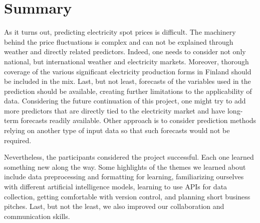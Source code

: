 \documentclass{article}
\numberwithin{equation}{section}
\begin{document}
\section{Summary}
As it turns out, predicting electricity spot prices is difficult. The machinery behind the price fluctuations is complex and can not be explained through weather and directly related predictors. Indeed, one needs to consider not only national, but international weather and electricity markets. Moreover, thorough coverage of the various significant electricity production forms in Finland should be included in the mix. Last, but not least, forecasts of the variables used in the prediction should be available, creating further limitations to the applicability of data. Considering the future continuation of this project, one might try to add more predictors that are directly tied to the electricity market and have long-term forecasts readily available. Other approach is to consider prediction methods relying on another type of input data so that such forecasts would not be required.

Nevertheless, the participants considered the project successful. Each one learned something new along the way. Some highlights of the themes we learned about include data preprocessing and formatting for learning, familiarizing ourselves with different artificial intelligence models, learning to use APIs for data collection, getting comfortable with version control, and planning short business pitches. Last, but not the least, we also improved our collaboration and communication skills.



\iffalse
\begin{figure}[htb]
\centering
\texttt{[image: ./largestEigenvalue.eps]}
\caption{Suurimman ominaisarvon approksimaatiovirheen itseisarvo $i$:n funktiona.}
\label{fig1}
\end{figure}
\fi
\end{document}
